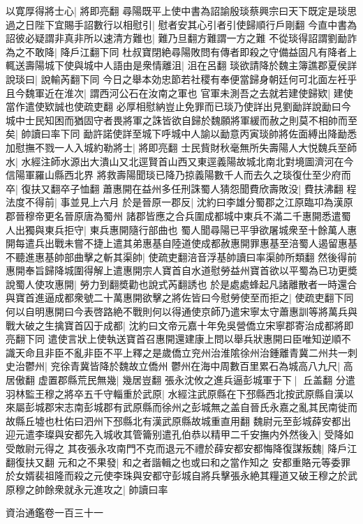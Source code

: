 以寛厚得將士心|{
	將即亮翻}
尋陽既平上使中書為詔諭殷琰蔡興宗曰天下既定是琰思過之日陛下宜賜手詔數行以相慰引|{
	慰者安其心引者引使歸順行戶剛翻}
今直中書為詔彼必疑謂非真非所以速清方難也|{
	難乃旦翻方難謂一方之難}
不從琰得詔謂劉勔詐為之不敢降|{
	降戶江翻下同}
杜叔寶閉絶尋陽敗問有傳者即殺之守備益固凡有降者上輒送壽陽城下使與城中人語由是衆情離沮|{
	沮在呂翻}
琰欲請降於魏主簿譙郡夏侯詳說琰曰|{
	說輸芮翻下同}
今日之舉本効忠節若社稷有奉便當歸身朝廷何可北面左衽乎且今魏軍近在淮次|{
	謂西河公石在汝南之軍也}
官軍未測吾之去就若建使歸欵|{
	建使當作遣使欵誠也使疏吏翻}
必厚相慰納豈止免罪而已琰乃使詳出見劉勔詳說勔曰今城中士民知困而猶固守者畏將軍之誅皆欲自歸於魏願將軍緩而赦之則莫不相帥而至矣|{
	帥讀曰率下同}
勔許諾使詳至城下呼城中人諭以勔意丙寅琰帥將佐面縛出降勔悉加慰撫不戮一人入城約勒將士|{
	將即亮翻}
士民貲財秋毫無所失壽陽人大悦魏兵至師水|{
	水經注師水源出大潰山又北逕賢首山西又東逕義陽故城北南北對境圖濟河在今信陽軍羅山縣西北界}
將救壽陽聞琰已降乃掠義陽數千人而去久之琰復仕至少府而卒|{
	復扶又翻卒子恤翻}
蕭惠開在益州多任刑誅蜀人猜怨聞費欣壽敗没|{
	費扶沸翻}
程法度不得前|{
	事並見上六月}
於是晉原一郡反|{
	沈約曰李雄分蜀郡之江原臨卭為漢原郡晉穆帝更名晉原唐為蜀州}
諸郡皆應之合兵圍成都城中東兵不滿二千惠開悉遣蜀人出獨與東兵拒守|{
	東兵惠開隨行部曲也}
蜀人聞尋陽已平爭欲屠城衆至十餘萬人惠開每遣兵出戰未嘗不捷上遣其弟惠基自陸道使成都赦惠開罪惠基至涪蜀人遏留惠基不聽進惠基帥部曲擊之斬其渠帥|{
	使疏吏翻涪音浮基帥讀曰率渠帥所類翻}
然後得前惠開奉旨歸降城圍得解上遣惠開宗人寶首自水道慰勞益州寶首欲以平蜀為已功更奬說蜀人使攻惠開|{
	勞力到翻奬勸也說式芮翻誘也}
於是處處蜂起凡諸離散者一時還合與寶首進逼成都衆號二十萬惠開欲擊之將佐皆曰今慰勞使至而拒之|{
	使疏吏翻下同}
何以自明惠開曰今表啓路絶不戰則何以得通使京師乃遣宋寧太守蕭惠訓等將萬兵與戰大破之生擒寶首囚于成都|{
	沈約曰文帝元嘉十年免吳營僑立宋寧郡寄治成都將即亮翻下同}
遣使言狀上使執送寶首召惠開還建康上問以舉兵狀惠開曰臣唯知逆順不識天命且非臣不亂非臣不平上釋之是歲僑立兖州治淮隂徐州治鍾離青冀二州共一刺史治鬱州|{
	兖徐青冀皆降於魏故立僑州}
鬱州在海中周數百里累石為城高八九尺|{
	高居傲翻}
虚置郡縣荒民無幾|{
	幾居豈翻}
張永沈攸之進兵逼彭城軍于下|{
	丘盖翻}
分遣羽林監王穆之將卒五千守輜重於武原|{
	水經注武原縣在下邳縣西北按武原縣自漢以來屬彭城郡宋志南彭城郡有武原縣而徐州之彭城無之盖自晉氏永嘉之亂其民南徙而故縣丘墟也杜佑曰泗州下邳縣北有漢武原縣故城重直用翻}
魏尉元至彭城薛安都出迎元遣李璨與安都先入城收其管籥别遣孔伯恭以精甲二千安撫内外然後入|{
	受降如受敵尉元得之}
其夜張永攻南門不克而退元不禮於薛安都安都悔降復謀叛魏|{
	降戶江翻復扶又翻}
元和之不果發|{
	和之者諧輯之也或曰和之當作知之}
安都重賂元等委罪於女婿裴祖隆而殺之元使李珠與安都守彭城自將兵擊張永絶其糧道又破王穆之於武原穆之帥餘衆就永元進攻之|{
	帥讀曰率}


資治通鑑卷一百三十一
